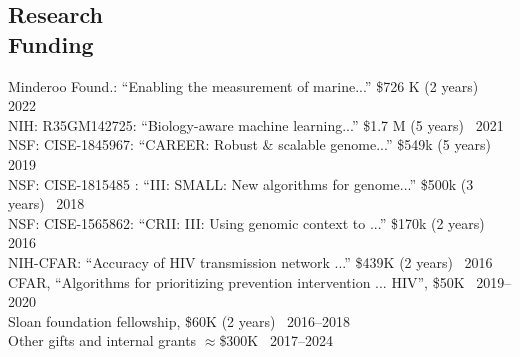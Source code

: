\documentclass[margin,line,letterpaper]{resume}
\begin{document}
\begin{resume}
    
    
    \section{\mysidestyle Research\\Funding}
     Minderoo Found.: ``Enabling the measurement of marine...''  \$726 K (2 years)~
 \hfill 2022\\
          NIH: R35GM142725:  ``Biology-aware machine learning...''
 \$1.7 M (5 years)~
  \hfill 2021\\
      NSF: CISE-1845967:  ``CAREER: Robust \& scalable genome...''
 \$549k (5 years)~
 \hfill 2019\\
      NSF: CISE-1815485 :  ``III: SMALL: New algorithms for genome...''
 \$500k (3 years)~
 \hfill 2018\\
 NSF: CISE-1565862:  ``CRII: III: Using genomic context to ...''
 \$170k (2 years)~
 \hfill 2016\\
 NIH-CFAR:  ``Accuracy of HIV transmission network ...''
 \$439K (2 years)~
 \hfill 2016\\
 CFAR, ``Algorithms for prioritizing prevention intervention ... HIV'', \$50K \hfill  ~2019--2020\\
  Sloan foundation fellowship, \$60K (2 years) \hfill  ~2016--2018\\
 Other gifts and internal grants $\approx$\$300K  \hfill  ~2017--2024







\end{resume}
\end{document}
